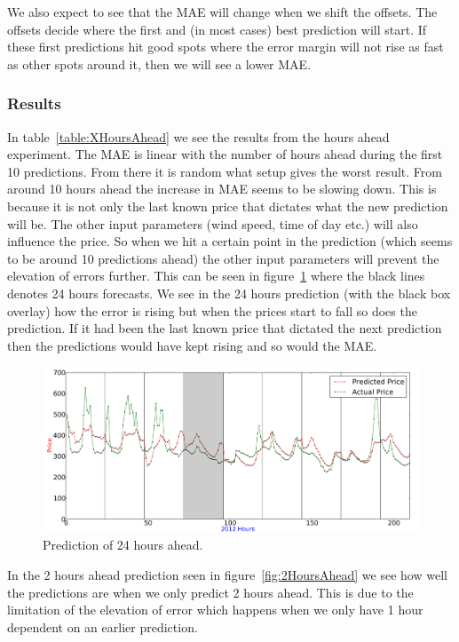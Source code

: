 We also expect to see that the MAE will change when we shift the offsets. The offsets decide where the first and (in most cases) best prediction will start. If these first predictions hit good spots where the error margin will not rise as fast as other spots around it, then we will see a lower MAE.

\subsubsection{Results}
In table~\ref{table:XHoursAhead} we see the results from the hours ahead experiment. The MAE is linear with the number of hours ahead during the first 10 predictions. From there it is random what setup gives the worst result. From around 10 hours ahead the increase in MAE seems to be slowing down. This is because it is not only the last known price that dictates what the new prediction will be. The other input parameters (wind speed, time of day etc.) will also influence the price. So when we hit a certain point in the prediction (which seems to be around 10 predictions ahead) the other input parameters will prevent the elevation of errors further. This can be seen in figure~\ref{fig:24HoursAhead_elevationOfError} where the black lines denotes 24 hours forecasts. We see in the 24 hours prediction (with the black box overlay) how the error is rising but when the prices start to fall so does the prediction. If it had been the last known price that dictated the next prediction then the predictions would have kept rising and so would the MAE.

\begin{figure}[H]
\centering
\includegraphics[width=\linewidth]{billeder/PriceExperimentalAnalysis/24HoursAhead_ElevationOfErrorExample.png}
\caption{Prediction of 24 hours ahead.}
\label{fig:24HoursAhead_elevationOfError}
\end{figure}

In the 2 hours ahead prediction seen in figure~\ref{fig:2HoursAhead} we see how well the predictions are when we only predict 2 hours ahead. This is due to the limitation of the elevation of error which happens when we only have 1 hour dependent on an earlier prediction.

